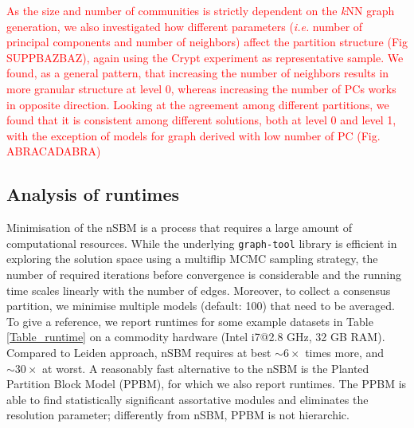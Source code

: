 \documentclass[10pt]{article}
\begin{document}
\textcolor{red}{As the size and number of communities is strictly dependent on the \emph{k}NN graph generation, we also investigated how different parameters (\emph{i.e.} number of principal components and number of neighbors) affect the partition structure (Fig SUPPBAZBAZ), again using the Crypt experiment as representative sample. We found, as a general pattern, that increasing the number of neighbors results in more granular structure at level 0, whereas increasing the number of PCs works in opposite direction. Looking at the agreement among different partitions, we found that it is consistent among different solutions, both at level 0 and level 1, with the exception of models for graph derived with low number of PC (Fig. ABRACADABRA)}



\subsection*{Analysis of runtimes}

Minimisation of the nSBM is a process that requires a large amount of computational resources. While the underlying \texttt{graph-tool} library is efficient in exploring the solution space using a multiflip MCMC sampling strategy, the number of required iterations before convergence is considerable and the running time scales linearly with the number of edges. Moreover, to collect a consensus partition, we minimise multiple models (default: 100) that need to be averaged. To give a reference, we report runtimes for some example datasets in Table \ref{Table_runtime} on a commodity hardware (Intel i7@2.8 GHz, 32 GB RAM). Compared to Leiden approach, nSBM requires at best $\sim6\times$ times more, and $\sim30\times$  at worst. A reasonably fast alternative to the nSBM is the Planted Partition Block Model (PPBM), for which we also report runtimes. The PPBM \cite{Zhang_Peixoto_2020} is able to find statistically significant assortative modules and eliminates the resolution parameter; differently from nSBM, PPBM is not hierarchic.
\end{document}
